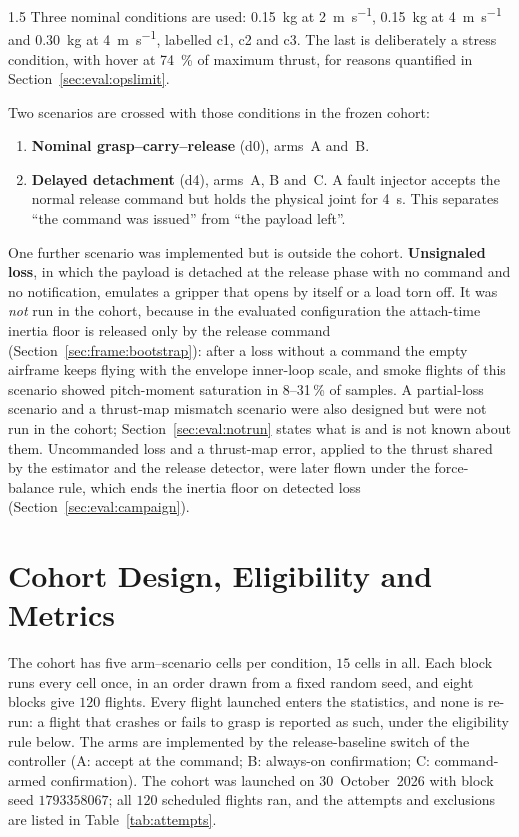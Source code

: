 \begin{spacing}{1.5}
Three nominal conditions are used: \SI{0.15}{\kg} at \SI{2}{\meter\per\second},
\SI{0.15}{\kg} at \SI{4}{\meter\per\second} and \SI{0.30}{\kg} at
\SI{4}{\meter\per\second}, labelled c1, c2 and c3. The last is deliberately a
stress condition, with hover at \SI{74}{\percent} of maximum thrust, for reasons
quantified in Section~\ref{sec:eval:opslimit}.

Two scenarios are crossed with those conditions in the frozen cohort:

\begin{enumerate}
\item \textbf{Nominal grasp--carry--release} (d0), arms~A and~B.
\item \textbf{Delayed detachment} (d4), arms~A, B and~C. A fault injector accepts
the normal release command but holds the physical joint for \SI{4}{\second}.
This separates ``the command was issued'' from ``the payload left''.
\end{enumerate}

One further scenario was implemented but is outside the cohort.
\textbf{Unsignaled loss}, in which the payload is detached at the release phase
with no command and no notification, emulates a gripper that opens by itself or
a load torn off. It was \emph{not} run in the cohort, because in the evaluated
configuration the attach-time inertia floor is released only by the release
command (Section~\ref{sec:frame:bootstrap}): after a loss without a command the
empty airframe keeps flying with the envelope inner-loop scale, and smoke flights
of this scenario showed pitch-moment saturation in 8--31\,\% of samples. A
partial-loss scenario and a thrust-map mismatch scenario were also designed but
were not run in the cohort; Section~\ref{sec:eval:notrun} states what is and is
not known about them. Uncommanded loss and a thrust-map error, applied to the
thrust shared by the estimator and the release detector, were later flown under
the force-balance rule, which ends the inertia
floor on detected loss (Section~\ref{sec:eval:campaign}).

\section{Cohort Design, Eligibility and Metrics}\label{sec:eval:cohort}

The cohort has five arm--scenario cells per condition, $15$ cells in all. Each
block runs every cell once, in an order drawn from a fixed random seed, and eight
blocks give $120$ flights. Every flight launched enters the statistics, and none
is re-run: a flight that crashes or fails to grasp is reported as such, under the
eligibility rule below. The arms are implemented by the release-baseline switch
of the controller (A: accept at the command; B: always-on confirmation; C:
command-armed confirmation). The cohort was launched on 30~October~2026 with
block seed $1793358067$; all $120$ scheduled flights ran, and the attempts and
exclusions are listed in Table~\ref{tab:attempts}.


\end{spacing}
